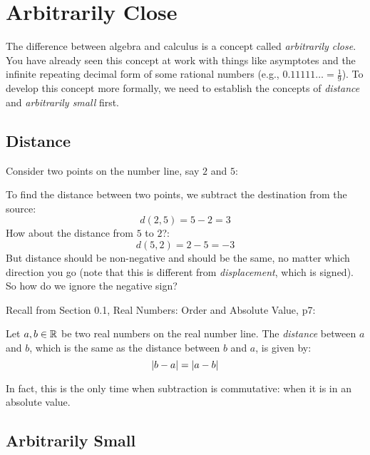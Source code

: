 \documentclass[letterpaper,12pt,fleqn]{article}
\begin{document}
\section*{Arbitrarily Close}

The difference between algebra and calculus is a concept called \emph{arbitrarily close}.  You have already seen this
concept at work with things like asymptotes and the infinite repeating decimal form of some rational numbers
(e.g., \(0.11111\ldots=\frac{1}{9}\)).  To develop this concept more formally, we need to establish the concepts of
\emph{distance} and \emph{arbitrarily small} first.

\subsection*{Distance}

Consider two points on the number line, say \(2\) and \(5\):

\bigskip


\bigskip

To find the distance between two points, we subtract the destination from the source:
\[d(2,5)=5-2=3\]
How about the distance from \(5\) to \(2\)?:
\[d(5,2)=2-5=-3\]
But distance should be non-negative and should be the same, no matter which direction you go (note that this is
different from \emph{displacement}, which is signed).  So how do we ignore the negative sign?

Recall from Section 0.1, Real Numbers: Order and Absolute Value, p7:

\begin{definition}[Distance]
  Let \(a,b\in\mathbb{R}\) be two real numbers on the real number line.  The \emph{distance} between \(a\) and \(b\), which
  is the same as the distance between \(b\) and \(a\), is given by:
  \[\lvert b-a\rvert=\lvert a-b\rvert\]
\end{definition}

In fact, this is the only time when subtraction is commutative: when it is in an absolute value.

\subsection*{Arbitrarily Small}
\end{document}
